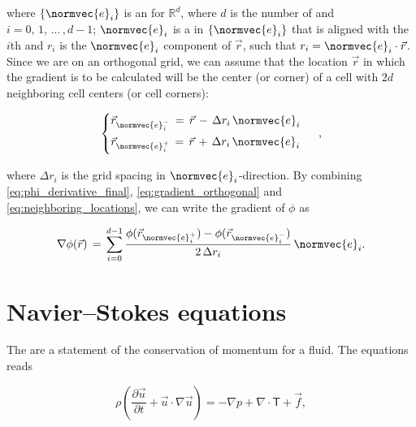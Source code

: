 where $\{\normvec{e}_i\}$ is an  for $\mathbb{R}^d$, where $d$ is the number of \dimensions and $i = 0,\,1,\,...\,,d-1$; $\normvec{e}_i$ is a  in $\{\normvec{e}_i\}$ that is aligned with the $i$th  and $r_i$ is the $\normvec{e}_i$ component of $\vec{r}$,
such that $r_i = \normvec{e}_i\cdot\vec{r}$. Since we are on an orthogonal grid, we can assume that the location $\vec{r}$ in which the gradient is to be calculated will be the center (or corner) of a cell with $2d$ neighboring cell centers (or cell corners):

\begin{equation} \label{eq:neighboring_locations}
\begin{cases}
\vec{r}_{\normvec{e}_i^-} \,=\, \vec{r} \,-\, \Delta r_i\,\normvec{e}_i\\[1ex]
\vec{r}_{\normvec{e}_i^+} \,=\, \vec{r} \,+\, \Delta r_i\,\normvec{e}_i\\[1ex]
\end{cases}\ ,
\end{equation}

where $\Delta r_i$ is the grid spacing in $\normvec{e}_i$-direction. By combining  \ref{eq:phi_derivative_final}, \ref{eq:gradient_orthogonal} and \ref{eq:neighboring_locations}, we can write the gradient of $\phi$ as

\begin{equation} \label{eq:gradient_final}
\nabla\phi(\vec{r}) \,=\,
\sum_{i=0}^{d-1}\frac{\phi(\vec{r}_{\normvec{e}_i^+})-\phi(\vec{r}_{\normvec{e}_i^-})}{2\,\Delta r_i}\,\normvec{e}_i.
\end{equation}

\section{Navier--Stokes equations}
\label{sec:ns_equations}

The  are a statement of the conservation of momentum for a fluid. The  equations reads

\begin{equation} \label{eq:navier_stokes}
\rho\left(\frac{\partial\vec{u}}{\partial t} + \vec{u}\cdot\nabla\vec{u}\right) = -\nabla p + \nabla\cdot\boldsymbol{\mathsf{T}} + \vec{f},
\end{equation}

